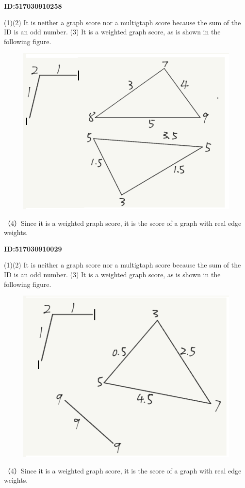 \documentclass{article} %
\begin{document}
	\textbf{ID:517030910258}\par
	(1)(2) It is neither a graph score nor a multigtaph score because the sum of the ID is an odd number.
	(3) It is a weighted graph score, as is shown in the following figure.
	
	\begin{figure}[H]
		\centering
		\includegraphics[scale=0.6]{10258.png}
		\caption{}
		\label{fig:2}
	\end{figure}
	（4）Since it is a weighted graph score, it is the score of a graph with real edge weights.

	\textbf{ID:517030910029}\par
	(1)(2) It is neither a graph score nor a multigtaph score because the sum of the ID is an odd number.
	(3) It is a weighted graph score, as is shown in the following figure.
	
	\begin{figure}[H]
		\centering
		\includegraphics[scale=0.6]{10029.png}
		\caption{}
		\label{fig:3}
	\end{figure}
	（4）Since it is a weighted graph score, it is the score of a graph with real edge weights.
\end{document}
